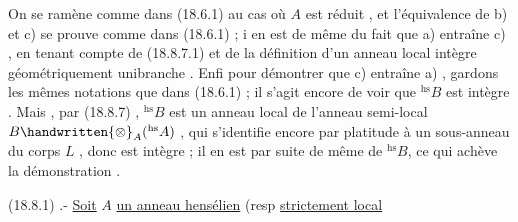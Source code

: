 On se ramène comme dans (18.6.1) au cas où $A$ est réduit \handwritten{[}, \handwritten{]} et l'équivalence de b) et c) se prouve comme dans (18.6.1) ; i en est de même du fait que a) entraîne c) , en tenant compte de (18.8.7.1) et de la définition d'un anneau local intègre géométriquement unibranche . Enfi pour démontrer que c) entraîne a) , gardons les mêmes notations que dans (18.6.1) ; il s'agit encore de voir que $ {}^{\mathrm{hs}}B$ est intègre . Mais , par (18.8.7) , $ {}^{\mathrm{hs}}B$ est un anneau local de l'anneau semi-local $B\handwritten{\otimes}_A({}^{\mathrm{hs}}A)$ , qui s'identifie encore par platitude à un sous-anneau du corps $L$ , donc est intègre ; il en est par suite de même de $ {}^{\mathrm{hs}}B$, \handwritten{\unsure{/}}ce qui achève la démonstration .

 (18.8.1) .- \uline{Soit} $A$ \uline{un anneau  hensélien} (resp \uline{strictement local}\handwritten{)}
